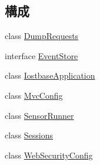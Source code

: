 \subsection*{構成}
\begin{DoxyCompactItemize}
\item 
class \hyperlink{classjp_1_1ac_1_1kyoto__u_1_1i_1_1soc_1_1ai_1_1iostbase_1_1_dump_requests}{Dump\-Requests}
\item 
interface \hyperlink{interfacejp_1_1ac_1_1kyoto__u_1_1i_1_1soc_1_1ai_1_1iostbase_1_1_event_store}{Event\-Store}
\item 
class \hyperlink{classjp_1_1ac_1_1kyoto__u_1_1i_1_1soc_1_1ai_1_1iostbase_1_1_iostbase_application}{Iostbase\-Application}
\item 
class \hyperlink{classjp_1_1ac_1_1kyoto__u_1_1i_1_1soc_1_1ai_1_1iostbase_1_1_mvc_config}{Mvc\-Config}
\item 
class \hyperlink{classjp_1_1ac_1_1kyoto__u_1_1i_1_1soc_1_1ai_1_1iostbase_1_1_sensor_runner}{Sensor\-Runner}
\item 
class \hyperlink{classjp_1_1ac_1_1kyoto__u_1_1i_1_1soc_1_1ai_1_1iostbase_1_1_sessions}{Sessions}
\item 
class \hyperlink{classjp_1_1ac_1_1kyoto__u_1_1i_1_1soc_1_1ai_1_1iostbase_1_1_web_security_config}{Web\-Security\-Config}
\end{DoxyCompactItemize}
